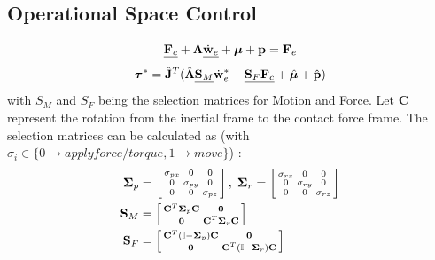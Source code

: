 \documentclass[a4paper, 8pt]{extarticle}
\begin{document}
\begin{multicols*}{3}
\subsection*{Operational Space Control}
$$
\underline{{\bf F}_c} + \bm\Lambda \underline{\dot{\bf w}_e} + \bm\mu + {\bf p} = {\bf F}_e $$
$$
\bm\tau^* = \hat{\bf J}^T(\hat{\bm\Lambda} \underline{{\bf S}_M} \dot{\bf w}_e^* + \underline{{\bf S}_F{\bf F}_c} + \hat{\bm\mu} + \hat{\bf p})
$$\newline
with $S_{M}$ and $S_{F}$ being the selection matrices for Motion and Force. Let {\bf C} represent the rotation from the inertial frame to the contact force frame. The selection matrices can be calculated as (with $\sigma_{i} \in \{0\rightarrow apply force/torque,1\rightarrow move\}$) :
\begin{align*}
\bm\Sigma_p &= \left[\begin{smallmatrix}
\sigma_{px} & 0 & 0 \\
0 & \sigma_{py} & 0 \\
0 & 0 & \sigma_{pz} \end{smallmatrix}\right], \;
\bm\Sigma_r = \left[\begin{smallmatrix}
\sigma_{rx} & 0 & 0 \\
0 & \sigma_{ry} & 0 \\
0 & 0 & \sigma_{rz} \end{smallmatrix}\right] \\
{\bf S}_M &= \left[\begin{smallmatrix}
{\bf C}^T\bm\Sigma_p{\bf C} & {\bf 0} \\
{\bf 0}  &  {\bf C}^T\bm\Sigma_r{\bf C}
\end{smallmatrix}\right]\\
{\bf S}_F &= \left[\begin{smallmatrix}
{\bf C}^T(\mathbb I - \bm\Sigma_p) {\bf C} & {\bf 0} \\
{\bf 0}  &  {\bf C}^T(\mathbb I - \bm\Sigma_r) {\bf C}
\end{smallmatrix}\right]
\end{align*}


\end{multicols*}
\end{document}
